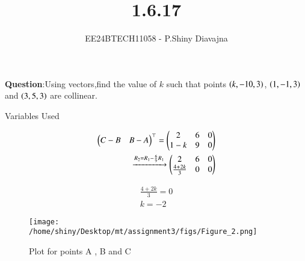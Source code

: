 \documentclass[journal]{IEEEtran}
\begin{document}

\vspace{3cm}

\title{1.6.17}
\author{EE24BTECH11058 - P.Shiny Diavajna}
{\let\newpage\relax\maketitle}

\renewcommand{\thefigure}{\theenumi}
\renewcommand{\thetable}{\theenumi}
\setlength{\intextsep}{10pt} %


\renewcommand{\thetable}{\theenumi}


\textbf{Question}:Using vectors,find the value of $k$ such that points $\left(k,-10,3\right)$, $\left(1,-1,3\right)$ and $\left(3,5,3\right)$ are collinear.\\

\solution 
    
\begin{table}[h!]    
     \centering
     
     \caption{Variables Used}
     \label{tab1.6.17.1}
   \end{table}

   \begin{align*}
     \begin{pmatrix}C-B & B-A\end{pmatrix}^\top =\begin{pmatrix}2 & 6 & 0 \\ 1-k & 9 & 0\end{pmatrix}\\
     \xrightarrow{R_2=R_1-\frac{6}{9}R_1} \begin{pmatrix}2 & 6 & 0 \\ \frac{4+2k}{3} & 0 & 0\end{pmatrix}\\ 
   \end{align*} 

   \begin{align*}
     \frac{4+2k}{3} = 0 \\
        k=-2
    \end{align*}


   \begin{figure}[h!]
    \centering
    \texttt{[image: /home/shiny/Desktop/mt/assignment3/figs/Figure\_2.png]}
    \caption{Plot for points A , B and C}
   \end{figure}
\end{document}

